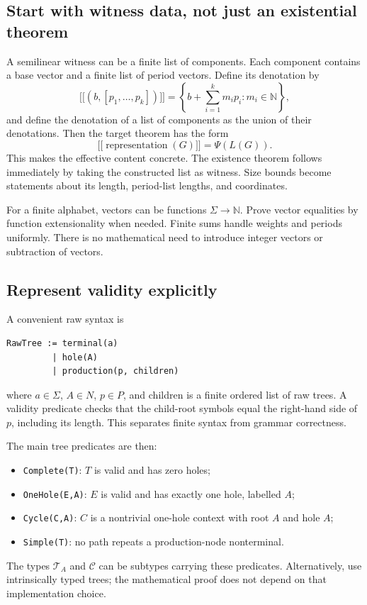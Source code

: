 \documentclass[11pt,a4paper]{article}
\numberwithin{equation}{section}
\theoremstyle{plain}
\theoremstyle{definition}
\theoremstyle{remark}
\newcommand{\N}{\mathbb N}
\newcommand{\Trees}{\mathcal T}
\newcommand{\Cycles}{\mathcal C}
\newcommand{\llbracket}{\mathopen{[\![}}
\newcommand{\rrbracket}{\mathclose{]\!]}}
\begin{document}
\subsection{Start with witness data, not just an existential theorem}
A semilinear witness can be a finite list of components. Each component contains a base vector and a finite list of period vectors. Define its denotation by
\[
\llbracket(b,[p_1,\ldots,p_k])\rrbracket
=\left\{b+\sum_{i=1}^k m_i p_i:m_i\in\N\right\},
\]
and define the denotation of a list of components as the union of their denotations. Then the target theorem has the form
\[
\llbracket\operatorname{representation}(G)\rrbracket=\Psi(L(G)).
\]
This makes the effective content concrete. The existence theorem follows immediately by taking the constructed list as witness. Size bounds become statements about its length, period-list lengths, and coordinates.

For a finite alphabet, vectors can be functions $\Sigma\to\N$. Prove vector equalities by function extensionality when needed. Finite sums handle weights and periods uniformly. There is no mathematical need to introduce integer vectors or subtraction of vectors.

\subsection{Represent validity explicitly}
A convenient raw syntax is
\begin{lstlisting}
RawTree := terminal(a)
         | hole(A)
         | production(p, children)
\end{lstlisting}
where $a\in\Sigma$, $A\in N$, $p\in P$, and children is a finite ordered list of raw trees. A validity predicate checks that the child-root symbols equal the right-hand side of $p$, including its length. This separates finite syntax from grammar correctness.

The main tree predicates are then:
\begin{itemize}
\item \texttt{Complete(T)}: $T$ is valid and has zero holes;
\item \texttt{OneHole(E,A)}: $E$ is valid and has exactly one hole, labelled $A$;
\item \texttt{Cycle(C,A)}: $C$ is a nontrivial one-hole context with root $A$ and hole $A$;
\item \texttt{Simple(T)}: no path repeats a production-node nonterminal.
\end{itemize}
The types $\Trees_A$ and $\Cycles$ can be subtypes carrying these predicates. Alternatively, use intrinsically typed trees; the mathematical proof does not depend on that implementation choice.
\end{document}
